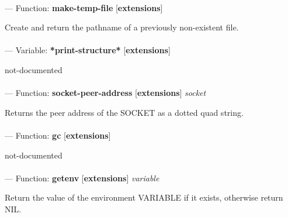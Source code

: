 \paragraph{}
\label{EXTENSIONS:MAKE-TEMP-FILE}
--- Function: \textbf{make-temp-file} [\textbf{extensions}] \textit{}

\begin{adjustwidth}{5em}{5em}
Create and return the pathname of a previously non-existent file.
\end{adjustwidth}

\paragraph{}
\label{EXTENSIONS:*PRINT-STRUCTURE*}
--- Variable: \textbf{*print-structure*} [\textbf{extensions}] \textit{}

\begin{adjustwidth}{5em}{5em}
not-documented
\end{adjustwidth}

\paragraph{}
\label{EXTENSIONS:SOCKET-PEER-ADDRESS}
--- Function: \textbf{socket-peer-address} [\textbf{extensions}] \textit{socket}

\begin{adjustwidth}{5em}{5em}
Returns the peer address of the SOCKET as a dotted quad string.
\end{adjustwidth}

\paragraph{}
\label{EXTENSIONS:GC}
--- Function: \textbf{gc} [\textbf{extensions}] \textit{}

\begin{adjustwidth}{5em}{5em}
not-documented
\end{adjustwidth}

\paragraph{}
\label{EXTENSIONS:GETENV}
--- Function: \textbf{getenv} [\textbf{extensions}] \textit{variable}

\begin{adjustwidth}{5em}{5em}
Return the value of the environment VARIABLE if it exists, otherwise return NIL.
\end{adjustwidth}


